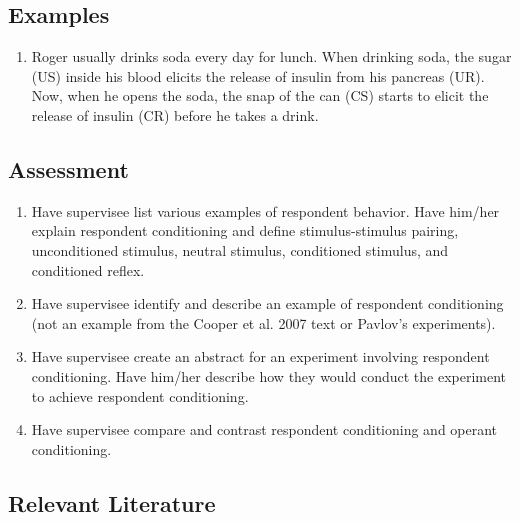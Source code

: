 \subsection{Examples}
\begin{enumerate}
\item Roger usually drinks soda every day for lunch. When drinking soda, the sugar (US) inside his blood elicits the release of insulin from his pancreas (UR). Now, when he opens the soda, the snap of the can (CS) starts to elicit the release of insulin (CR) before he takes a drink. 
%
\end{enumerate}
%
\subsection{Assessment}
\begin{enumerate}
\item Have supervisee list various examples of respondent behavior. Have him/her explain respondent conditioning and define stimulus-stimulus pairing, unconditioned stimulus, neutral stimulus, conditioned stimulus, and conditioned reflex.
\item Have supervisee identify and describe an example of respondent conditioning (not an example from the Cooper et al. 2007 text or Pavlov's experiments). 
\item Have supervisee create an abstract for an experiment involving respondent conditioning. Have him/her describe how they would conduct the experiment to achieve respondent conditioning.
\item Have supervisee compare and contrast respondent conditioning and operant conditioning.
\end{enumerate}
%
\subsection{Relevant Literature}
\begin{refsection}
\nocite{catania1998learning,
        cooper2007applied,
        skinner1984evolution,
        poling2001principles,
        skinner1938behavior,
        pavlov1928lectures}
\printbibliography[heading=none]
\end{refsection}
%
